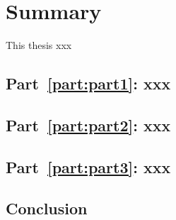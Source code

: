 \chapter[Summary]{Summary}

\cleardoublepage

This thesis xxx

\section*{Part~\ref{part:part1}: xxx}

\section*{Part~\ref{part:part2}: xxx}

\section*{Part~\ref{part:part3}: xxx}

\section*{Conclusion}

\clearpage
\thispagestyle{empty}
~
\cleardoublepage